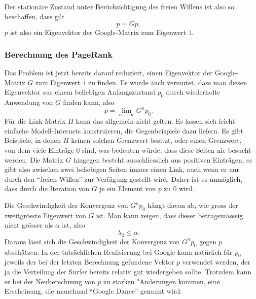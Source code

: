 Der stationäre Zustand unter Berücksichtigung des freien Willens ist also
so beschaffen, dass gilt
\[
p=Gp,
\]
$p$ ist also ein Eigenvektor der Google-Matrix zum Eigenwert $1$.

\subsubsection{Berechnung des PageRank}
Das Problem ist jetzt bereits darauf reduziert, einen Eigenvektor der
Google-Matrix $G$ zum Eigenwert $1$ zu finden.
Es wurde auch vermutet, dass man diesen Eigenvektor
aus einem beliebigen Anfangszustand $p_0$ durch wiederholte Anwendung von
$G$ finden kann, also
\[
p=\lim_{n\to\infty}G^np_0.
\]
Für die Link-Matrix $H$ kann das allgemein nicht gelten.
Es lassen sich leicht einfache Modell-Internets konstruieren,
die Gegenbeispiele dazu liefern.
Es gibt Beispiele, in denen
$H$ keinen solchen Grenzwert besitzt, oder einen Grenzwert, von dem
viele Einträge $0$ sind, was bedeuten würde, dass diese Seiten nie besucht
werden.
Die Matrix $G$ hingegen besteht ausschliesslich aus positiven Einträgen, es
gibt also zwischen zwei beliebigen Seiten immer einen Link, auch wenn er nur
durch den ``freien Willen'' zur Verfügung gestellt wird.
Daher ist es unmöglich,
dass durch die Iteration von $G$ je ein Element von $p$ zu $0$ wird.

Die Geschwindigkeit der Konvergenz von $G^np_0$ hängt davon ab, wie gross der
zweitgrösste Eigenwert von $G$ ist.
Man kann zeigen, dass dieser betragsmässsig
nicht grösser als $\alpha$ ist, also
\[
\lambda_2\le \alpha.
\]
Daraus lässt sich die Geschwindigkeit der Konvergenz von $G^np_0$ gegen $p$
abschätzen.
In der tatsächlichen Realisierung bei Google kann natürlich
für $p_0$ jeweils der bei der letzten Berechnung gefundene Vektor $p$ verwendet
werden, der ja die Verteilung der Surfer bereits relativ gut wiedergeben sollte.
Trotzdem kann es bei der Neuberechnung von $p$ zu starken "Anderungen kommen,
eine Erscheinung, die manchmal ``Google Dance'' genannt wird.
